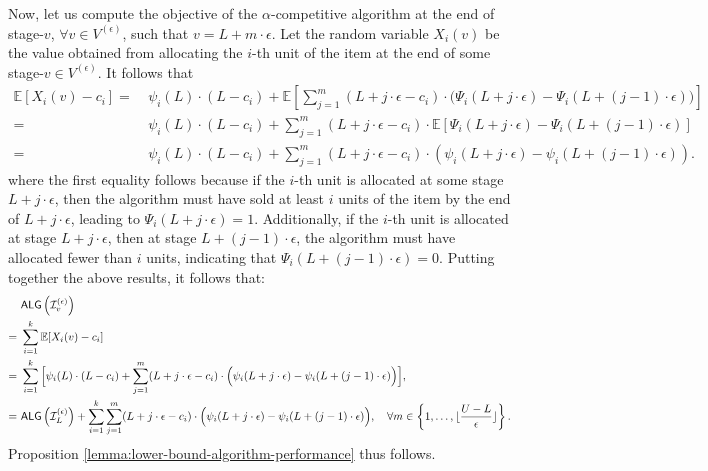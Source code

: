 Now, let us compute the objective of the $\alpha$-competitive algorithm at the end of stage-$v$, $ \forall v\in V^{(\epsilon)}$, such that $v = L + m \cdot \epsilon$. Let the random variable $X_{i}(v)$ be the value obtained from allocating the $i$-th unit of the item at the end of some stage-$v \in V^{(\epsilon)}$. It follows that
\begin{align*}
    \mathbb{E}[X_{i}(v)-c_{i}] =\ & \psi_{i}(L)\cdot(L-c_{i}) +  \mathbb{E}\left[\sum_{j=1}^{m} (L + j \cdot \epsilon - c_{i}) \cdot \Big(\Psi_{i}(L + j \cdot \epsilon) - \Psi_{i}(L + (j-1) \cdot \epsilon) \Big) \right] \\
    =\ &  \psi_{i}(L)\cdot(L-c_{i}) + \sum_{j=1}^{m} (L + j \cdot \epsilon - c_{i}) \cdot \mathbb{E}\left[\Psi_{i}(L + j \cdot \epsilon) - \Psi_{i}(L + (j-1) \cdot \epsilon) \right] \\
    =\ & \psi_{i}(L)\cdot(L-c_{i}) + \sum_{j=1}^{m} (L + j \cdot \epsilon - c_{i}) \cdot \left ( \psi_{i}(L + j \cdot \epsilon) - \psi_{i}(L + (j-1) \cdot \epsilon) \right).
\end{align*}
where the first equality follows because if the $i$-th unit is allocated at some stage $L + j \cdot \epsilon$, then the algorithm must have sold at least $i$ units of the item by the end of $L + j \cdot \epsilon$, leading to $\Psi_i(L + j \cdot \epsilon) = 1 $. Additionally, if the $i$-th unit is allocated at stage $L + j \cdot \epsilon$, then at stage $L + (j-1) \cdot \epsilon $, the algorithm must have allocated fewer than $i$ units, indicating that $\Psi_i(L + (j-1) \cdot \epsilon) = 0 $.
Putting together the above results, it follows that:
\begin{align*}
      & \textsf{ALG}\left(\mathcal{I}^{(\epsilon)}_{v}\right) \\
    =\ &  \sum_{i=1}^{k}  \mathbb{E}[X_{i}(v)-c_{i}]  \\
    =\ &  \sum_{i=1}^{k} \Big[\psi_{i}(L)\cdot(L-c_{i})+ \sum_{j=1}^{m} (L + j \cdot \epsilon - c_{i}) \cdot \Big(\psi_{i}(L + j \cdot \epsilon) - \psi_{i}(L + (j-1) \cdot \epsilon)\Big) \Big] , \\
    =\ &  \textsf{ALG}\left(\mathcal{I}^{(\epsilon)}_{L}\right) +  \sum_{i=1}^{k}  \sum_{j=1}^{m} (L + j \cdot \epsilon - c_{i}) \cdot \Big( \psi_{i}(L + j \cdot \epsilon) - \psi_{i}(L + (j-1) \cdot \epsilon) \Big), \quad \forall m \in \left\{1,\dots, \lfloor \frac{U-L}{\epsilon} \rfloor \right\}.
\end{align*}
Proposition  \ref{lemma:lower-bound-algorithm-performance} thus follows.

